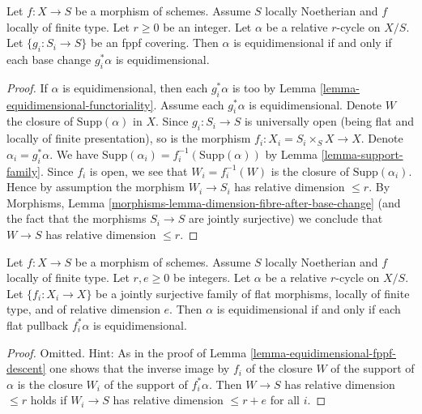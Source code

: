 \begin{lemma}
\label{lemma-equidimensional-fppf-descent}
Let $f : X \to S$ be a morphism of schemes. Assume $S$ locally Noetherian
and $f$ locally of finite type. Let $r \geq 0$ be an integer. Let $\alpha$
be a relative $r$-cycle on $X/S$. Let $\{g_i : S_i \to S\}$
be an fppf covering. Then $\alpha$ is equidimensional
if and only if each base change $g_i^*\alpha$ is equidimensional.
\end{lemma}

\begin{proof}
If $\alpha$ is equidimensional, then each $g_i^*\alpha$ is too by
Lemma \ref{lemma-equidimensional-functoriality}. Assume each $g_i^*\alpha$
is equidimensional. Denote $W$ the closure
of $\text{Supp}(\alpha)$ in $X$. Since $g_i : S_i \to S$ is universally open
(being flat and locally of finite presentation), so is the morphism
$f_i : X_i = S_i \times_S X \to X$. Denote $\alpha_i = g_i^*\alpha$. We have
$\text{Supp}(\alpha_i) = f_i^{-1}(\text{Supp}(\alpha))$ by
Lemma \ref{lemma-support-family}.
Since $f_i$ is open, we see that $W_i = f_i^{-1}(W)$ is the closure
of $\text{Supp}(\alpha_i)$. Hence by assumption the morphism
$W_i \to S_i$ has relative dimension $\leq r$.
By Morphisms, Lemma \ref{morphisms-lemma-dimension-fibre-after-base-change}
(and the fact that the morphisms $S_i \to S$ are jointly surjective)
we conclude that $W \to S$ has relative dimension $\leq r$.
\end{proof}

\begin{lemma}
\label{lemma-equidimensional-descent-pullbacks}
Let $f : X \to S$ be a morphism of schemes. Assume $S$ locally Noetherian
and $f$ locally of finite type. Let $r, e \geq 0$ be integers.
Let $\alpha$ be a relative $r$-cycle on $X/S$.
Let $\{f_i : X_i \to X\}$ be a jointly surjective family
of flat morphisms, locally of finite type, and of relative dimension $e$.
Then $\alpha$ is equidimensional if and only if each flat
pullback $f_i^*\alpha$ is equidimensional.
\end{lemma}

\begin{proof}
Omitted. Hint: As in the proof of Lemma \ref{lemma-equidimensional-fppf-descent}
one shows that the inverse image by $f_i$ of the closure $W$ of the support of
$\alpha$ is the closure $W_i$ of the support of $f_i^*\alpha$. Then
$W \to S$ has relative dimension $\leq r$ holds if $W_i \to S$
has relative dimension $\leq r + e$ for all $i$.
\end{proof}

